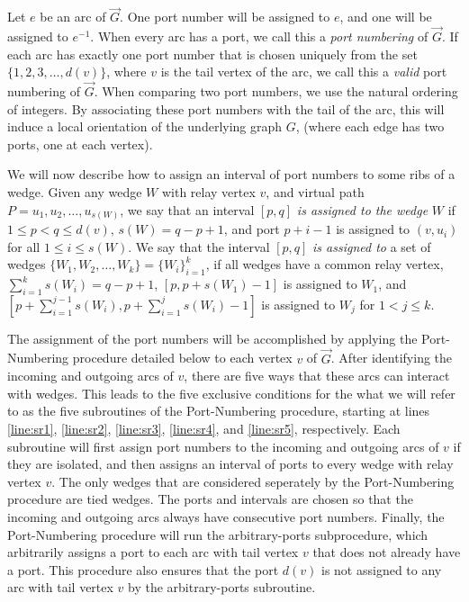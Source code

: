 \documentclass[12pt,letterpaper,oneside]{book}
\begin{document}
Let $e$ be an arc of $\vec{G}$.  One port number will be assigned to $e$, and one will be assigned 
to $e^{-1}$.   When every arc has a port, we call this a \emph{port numbering} of $\vec{G}$.  
If each arc has exactly one port number that is chosen uniquely from the set 
$\{ 1 , 2 , 3 , \ldots , d(v)\}$, where $v$ is the tail vertex of the arc, we call this a \emph{valid} port numbering of $\vec{G}$.  
When comparing two port numbers, we use 
the natural ordering of integers.  By associating these port numbers with the tail of the arc, this will induce 
a local orientation of the underlying graph $G$, (where each edge has two ports, one at each vertex).   
 
  
We will now describe how to assign an interval of port numbers to some ribs of a wedge.   
Given any wedge $W$ with relay vertex $v$,  
and virtual path $P=u_1,u_2,\ldots,u_{s(W)}$, we  
say that an interval $[p,q]$ \emph{is assigned to the wedge} $W$ if $1\le p<q \le d(v)$, $s(W)=q-p+1$, and 
port $p+i-1$ is assigned to $(v,u_i)$ for all $1\le i\le s(W)$.   
We say that the interval $[p,q]$ \emph{is assigned to} a set of wedges $\{W_1,W_2,\ldots,W_k\}=\{W_i\}_{i=1}^k$, 
if all wedges have a common relay vertex, 
$\sum_{i=1}^k s(W_i) = q-p+1$, 
$[p,p+s(W_1)-1]$ is assigned to $W_1$, and 
$[p+\sum_{i=1}^{j-1} s(W_i), p+\sum_{i=1}^j s(W_i) -1]$ is assigned to $W_j$ for $1< j\le k$.  

 
The assignment of the port numbers will be accomplished by applying the Port-Numbering procedure detailed below to 
each vertex $v$ of $\vec{G}$.  After identifying the incoming and outgoing arcs of $v$, there are five ways 
that these arcs can interact with wedges.  This leads to the five exclusive conditions for the 
what we will refer to as the five subroutines of the Port-Numbering procedure, starting at lines 
\ref{line:sr1}, \ref{line:sr2}, \ref{line:sr3}, \ref{line:sr4}, and \ref{line:sr5}, respectively.  Each subroutine 
will first assign port numbers to the incoming and outgoing arcs of $v$ if they are isolated, and then assigns 
an interval of ports to every wedge with relay vertex $v$.  The only wedges that are considered seperately by 
the Port-Numbering procedure are 
tied wedges.  The ports and intervals are chosen so that 
the incoming and outgoing arcs always have consecutive port numbers.  
Finally, the Port-Numbering procedure will run the arbitrary-ports subprocedure, which 
arbitrarily assigns 
a port to each arc with tail vertex $v$ 
that does not already have a port.  This procedure also ensures that the port $d(v)$ is not assigned to any arc with tail 
vertex $v$ by the arbitrary-ports subroutine.  
\end{document}
